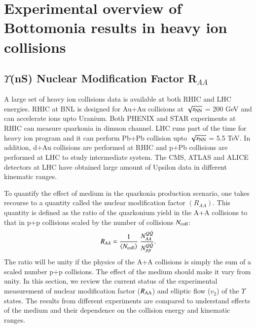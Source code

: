 \section{Experimental overview of Bottomonia results in heavy ion collisions}

\subsection{$\Upsilon$(nS) Nuclear Modification Factor R$_{AA}$}
A large set of heavy ion collisions data is available at both RHIC and LHC energies.
RHIC at BNL is designed for Au+Au collisions
at $\sqrt{s_{\rm NN}}$ = 200 GeV and can accelerate ions upto Uranium. Both PHENIX and
STAR experiments at RHIC can measure quarkonia in dimuon channel. 
LHC runs part of the time for heavy ion program and it
can perform Pb+Pb collision upto $\sqrt{s_{\rm NN}}$ = 5.5 TeV. In addition, d+Au collisions
are performed at RHIC and p+Pb collisions are performed at LHC to study
intermediate system. The CMS, ATLAS and ALICE detectors at LHC have obtained large
amount of Upsilon data in different kinematic ranges.

To quantify the effect of medium in the quarkonia production scenario, one takes
recourse to a quantity called the nuclear modification factor $(R_{AA})$. This quantity
is defined as the ratio of the quarkonium yield in the A+A collisions to that
in p+p collisions scaled by the number of collisions $N_{\rm coll}$: 
 \begin{equation}
 R_{AA} = \frac{1}{\langle N_{\rm coll} \rangle} \ \frac {N^{Q{\bar Q}}_{AA}} {N^{Q{\bar Q}}_{pp}}.
 \end{equation}
 The ratio will be unity if the physics of the A+A collisions is simply the sum of
 a scaled number p+p collisions. The effect of the medium should make it vary from unity. 
In this section, we review the current status of the experimental measurement
of nuclear modification factor ($R_{\rm AA}$) and elliptic flow ($v_{2}$) of the
$\Upsilon$ states. The results from different experiments are compared to
understand effects of the medium and their dependence on the collision energy
and kinematic ranges. 

